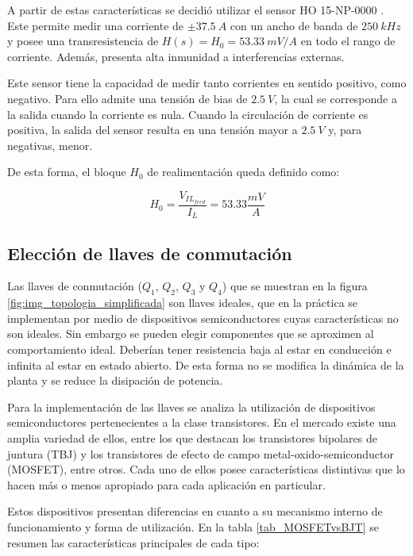 A partir de estas características se decidió utilizar el sensor HO 15-NP-0000 \cite{HO15-NP}. Este permite medir una corriente de $\pm 37.5\:A$ con un ancho de banda de $250\:kHz$ y posee una transresistencia de $H(s)=H_0=53.33\:mV/A$ en todo  el rango de corriente. Además, presenta alta inmunidad a interferencias externas. 

Este sensor tiene la capacidad de medir tanto corrientes en sentido positivo, como negativo. Para ello admite una tensión de bias de $2.5\:V$, la cual se corresponde a la salida cuando la corriente es nula. Cuando la circulación de corriente es positiva, la salida del sensor resulta en una tensión mayor a $2.5\:V$ y, para negativas, menor.

De esta forma, el bloque $H_0$ de realimentación queda definido como:

\begin{equation}
	H_0=\frac{V_{IL_{feed}}}{I_L}=53.33 \frac{mV}{A}
\end{equation}


\subsection{Elección de llaves de conmutación}

Las llaves de conmutación ($Q_1$, $Q_2$, $Q_3$ y $Q_4$) que se muestran en la figura \ref{fig:img_topologia_simplificada} son llaves ideales, que en la práctica se implementan por medio de dispositivos semiconductores cuyas características no son ideales. Sin embargo se pueden elegir componentes que se aproximen al comportamiento ideal. Deberían tener resistencia baja al estar en conducción e infinita al estar en estado abierto. De esta forma no se modifica la dinámica de la planta y se reduce la disipación de potencia.

Para la implementación de las llaves se analiza la utilización de dispositivos semiconductores pertenecientes a la clase transistores. En el mercado existe una amplia variedad de ellos, entre los que destacan los transistores bipolares de juntura (TBJ) y los transistores de efecto de campo metal-oxido-semiconductor (MOSFET), entre otros. Cada uno de ellos posee características distintivas que lo hacen más o menos apropiado para cada aplicación en particular. 

Estos dispositivos presentan diferencias en cuanto a su mecanismo interno de funcionamiento y forma de utilización. En la tabla \ref{tab_MOSFETvsBJT} se resumen las características principales de cada tipo:


